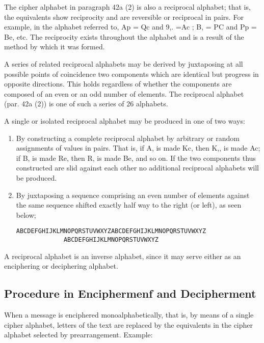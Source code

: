 \mypara The cipher alphabet in paragraph 42a (2) is also a reciprocal
alphabet; that is, the equivalents show reciprocity and are reversible or
reciprocal in pairs. For example, in the alphabet referred to, Ap = Qc
and 9,. =Ac ; B, = PC and Pp = Be, etc. The reciprocity exists throughout the alphabet and is a result of the method by which it was formed.

\mypara A series of related reciprocal alphabets may be derived by juxtaposing at all possible points of coincidence two components which are identical but progress in opposite directions. This holds regardless of whether
the components are composed of an even or an odd number of elements.
The reciprocal alphabet (par. 42a (2)) is one of such a series of 26
alphabets.

\mypara A single or isolated reciprocal alphabet may be produced in one of
two ways:

\begin{enumerate}
\item By constructing a complete reciprocal alphabet by arbitrary or
random assignments of values in pairs. That is, if A, is made
Kc, then K,, is made Ac; if B, is made Re, then R, is made Be,
and so on. If the two components thus constructed are slid
against each other no additional reciprocal alphabets will be
produced.

\item By juxtaposing a sequence comprising an even number of
elements against the same sequence shifted exactly half way to
the right (or left), as seen below;

\begin{verbatim}
ABCDEFGHIJKLMNOPQRSTUVWXYZABCDEFGHIJKLMNOPQRSTUVWXYZ
             ABCDEFGHIJKLMNOPQRSTUVWXYZ
\end{verbatim}
\end{enumerate}

\mypara A reciprocal alphabet is an inverse alphabet, since it may serve
either as an enciphering or deciphering alphabet.

\subsection{Procedure in Enciphermenf and Decipherment}

\mypara When a message is enciphered monoalphabetically, that is, by
means of a single cipher alphabet, letters of the text are replaced by the
equivalents in the cipher alphabet selected by prearrangement. Example:

